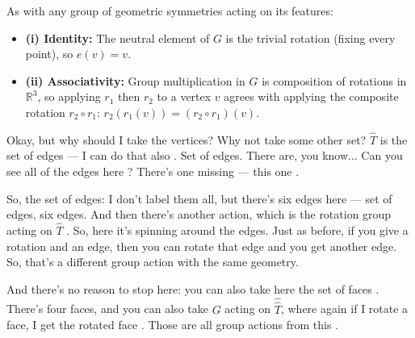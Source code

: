 \begin{content}
\begin{steps}
As with any group of geometric symmetries acting on its features:
\begin{itemize}
    \item \textbf{(i) Identity:} The neutral element of $G$ is the trivial rotation (fixing every point), so $e(v) = v$.
    \item \textbf{(ii) Associativity:} Group multiplication in $G$ is composition of rotations in $\mathbb{R}^3$, so applying $r_1$ then $r_2$ to a vertex $v$ agrees with applying the composite rotation $r_2 \circ r_1$: $r_2(r_1(v)) = (r_2 \circ r_1)(v)$.
\end{itemize}
\end{steps}
\end{content}

\begin{speech}[00:57:11 - 00:58:28]
Okay, but why should I take the vertices? Why not take some other set? $\hat{T}$ is the set of edges --- I can do that also . Set of edges. There are, you know... Can you see all of the edges here ? There's one missing --- this one .

So, the set of edges: I don't label them all, but there's six edges here --- set of edges, six edges. And then there's another action, which is the rotation group acting on $\hat{T}$ . So, here it's spinning around the edges. Just as before, if you give a rotation and an edge, then you can rotate that edge and you get another edge. So, that's a different group action with the same geometry.

And there's no reason to stop here: you can also take here the set of faces . There's four faces, and you can also take $G$ acting on $\hat{\hat{T}}$, where again if I rotate a face, I get the rotated face . Those are all group actions from this .
\end{speech}

